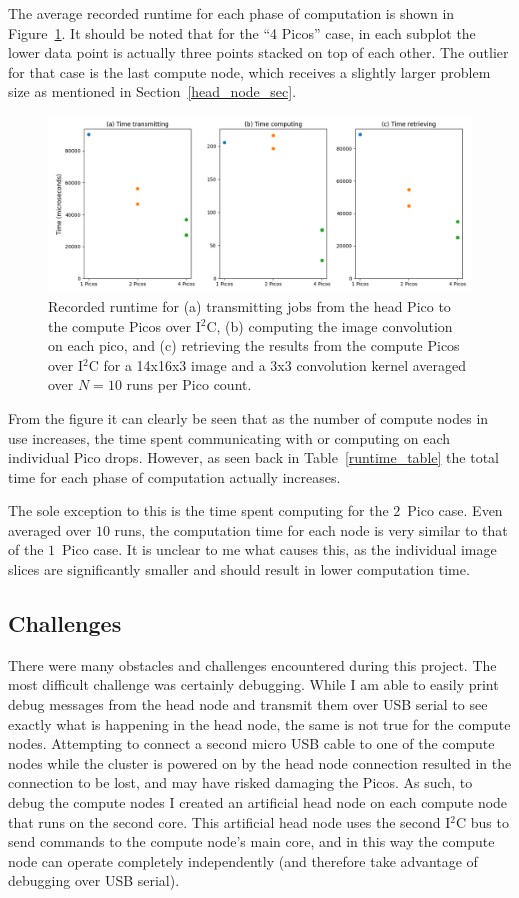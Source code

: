 \documentclass[conference]{IEEEtran}
\begin{document}
The average recorded runtime for each phase of computation is shown in Figure~\ref{nprocs_plot}.
It should be noted that for the ``4 Picos'' case, in each subplot the lower data point is actually three points stacked on top of each other. 
The outlier for that case is the last compute node, which receives a slightly larger problem size as mentioned in Section~\ref{head_node_sec}.

\begin{figure}[ht]
\includegraphics[width=\textwidth]{nprocs_plots.png}
\caption{Recorded runtime for (a) transmitting jobs from the head Pico to the compute Picos over I$^2$C, (b) computing the image convolution on each pico, and (c) retrieving the results from the compute Picos over I$^2$C for a 14x16x3 image and a 3x3 convolution kernel averaged over $N=10$ runs per Pico count.}
\label{nprocs_plot}
\end{figure}

From the figure it can clearly be seen that as the number of compute nodes in use increases, the time spent communicating with or computing on each individual Pico drops.
However, as seen back in Table~\ref{runtime_table} the total time for each phase of computation actually increases.

The sole exception to this is the time spent computing for the $2$~Pico case. 
Even averaged over $10$ runs, the computation time for each node is very similar to that of the $1$~Pico case.
It is unclear to me what causes this, as the individual image slices are significantly smaller and should result in lower computation time.

\subsection{Challenges}

There were many obstacles and challenges encountered during this project. 
The most difficult challenge was certainly debugging. 
While I am able to easily print debug messages from the head node and transmit them over USB serial to see exactly what is happening in the head node, the same is not true for the compute nodes. 
Attempting to connect a second micro USB cable to one of the compute nodes while the cluster is powered on by the head node connection resulted in the connection to be lost, and may have risked damaging the Picos.
As such, to debug the compute nodes I created an artificial head node on each compute node that runs on the second core.
This artificial head node uses the second I$^2$C bus to send commands to the compute node's main core, and in this way the compute node can operate completely independently (and therefore take advantage of debugging over USB serial).
\end{document}
